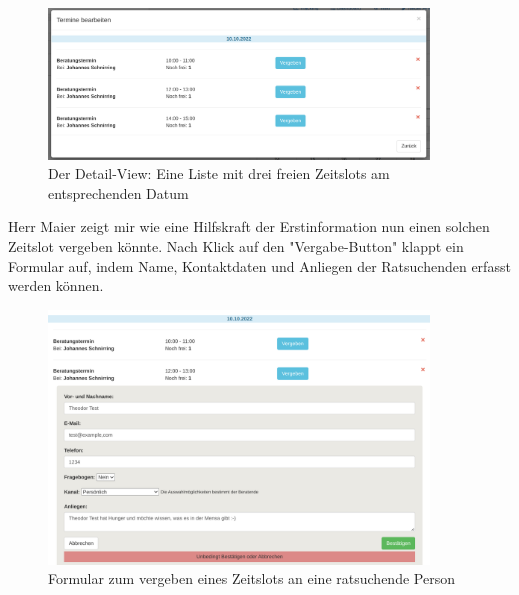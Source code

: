 \documentclass[12pt]{article}
\newcommand{\ipName}{Herr Maier }
\begin{document}
\begin{figure}[h]
    \caption{Der Detail-View: Eine Liste mit drei freien Zeitslots am entsprechenden Datum}
    \centering
    \includegraphics[width=0.9\textwidth]{screen_old_daylist.png}
\end{figure}

\ipName zeigt mir wie eine Hilfskraft der Erstinformation nun einen solchen
Zeitslot vergeben könnte. Nach Klick auf den "Vergabe-Button" klappt ein
Formular auf, indem Name, Kontaktdaten und Anliegen der Ratsuchenden erfasst
werden können.

\begin{figure}[h]
    \caption{Formular zum vergeben eines Zeitslots an eine ratsuchende Person}
    \centering
    \includegraphics[width=0.9\textwidth]{screen_old_clientdata.png}
\end{figure}
\end{document}
